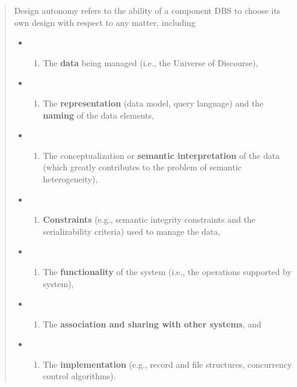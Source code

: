 \begin{quote}
Design autonomy refers to the ability of a component DBS to choose its
own design with respect to any matter, including

\begin{itemize}
\item
  \begin{enumerate}
  \def\labelenumi{(\alph{enumi})}
  \tightlist
  \item
    The \textbf{data} being managed (i.e., the Universe of Discourse),
  \end{enumerate}
\item
  \begin{enumerate}
  \def\labelenumi{(\alph{enumi})}
  \setcounter{enumi}{1}
  \tightlist
  \item
    The \textbf{representation} (data model, query language) and the
    \textbf{naming} of the data elements,
  \end{enumerate}
\item
  \begin{enumerate}
  \def\labelenumi{(\alph{enumi})}
  \setcounter{enumi}{2}
  \tightlist
  \item
    The conceptualization or \textbf{semantic interpretation} of the
    data (which greatly contributes to the problem of semantic
    heterogeneity),
  \end{enumerate}
\item
  \begin{enumerate}
  \def\labelenumi{(\alph{enumi})}
  \setcounter{enumi}{3}
  \tightlist
  \item
    \textbf{Constraints} (e.g., semantic integrity constraints and the
    serializability criteria) used to manage the data,
  \end{enumerate}
\item
  \begin{enumerate}
  \def\labelenumi{(\alph{enumi})}
  \setcounter{enumi}{4}
  \tightlist
  \item
    The \textbf{functionality} of the system (i.e., the operations
    supported by system),
  \end{enumerate}
\item
  \begin{enumerate}
  \def\labelenumi{(\alph{enumi})}
  \setcounter{enumi}{5}
  \tightlist
  \item
    The \textbf{association and sharing with other systems}, and
  \end{enumerate}
\item
  \begin{enumerate}
  \def\labelenumi{(\alph{enumi})}
  \setcounter{enumi}{6}
  \tightlist
  \item
    The \textbf{implementation} (e.g., record and file structures,
    concurrency control algorithms).
  \end{enumerate}
\end{itemize}
\end{quote}

